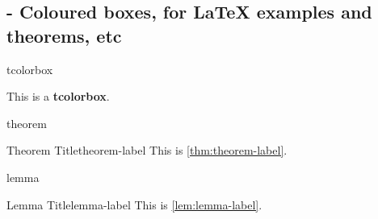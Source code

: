 
\subsection{ - Coloured boxes, for LaTeX examples and theorems, etc}

\begin{demo}{}{tcolorbox}
  \begin{tcolorbox}
    This is a \textbf{tcolorbox}.
  \end{tcolorbox}
\end{demo}

\begin{demo}{}{theorem}
  \begin{thm}{Theorem Title}{theorem-label}
    This is \cref{thm:theorem-label}.
  \end{thm}
\end{demo}

\begin{demo}{}{lemma}
  \begin{lem}{Lemma Title}{lemma-label}
    This is \cref{lem:lemma-label}.
  \end{lem}
\end{demo}
